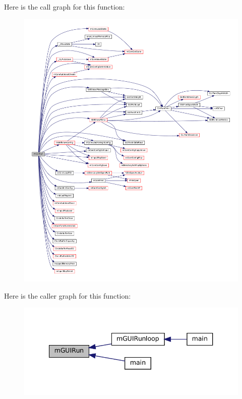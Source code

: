 Here is the call graph for this function\+:
\nopagebreak
\begin{figure}[H]
\begin{center}
\leavevmode
\includegraphics[width=350pt]{gui-runner_8h_a857680d78d61544055058419bdca0bed_cgraph}
\end{center}
\end{figure}
Here is the caller graph for this function\+:
\nopagebreak
\begin{figure}[H]
\begin{center}
\leavevmode
\includegraphics[width=340pt]{gui-runner_8h_a857680d78d61544055058419bdca0bed_icgraph}
\end{center}
\end{figure}
\mbox{\label{gui-runner_8h_a613515116fcdd9bb3f2743607aa0c18e}} 
